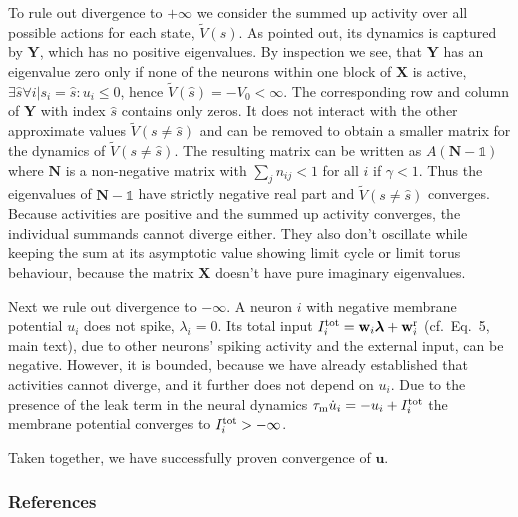 \documentclass[a4paper,11pt]{article}
\newcommand{\vw}{{\mathbf w}}
\newcommand{\vu}{{\mathbf u}}
\newcommand{\vlambda}{{\bm \lambda}}
\newcommand{\vX}{{\mathbf X}}
\newcommand{\vY}{{\mathbf Y}}
\newcommand{\vN}{{\mathbf N}}
\newcommand{\tV}{{\tilde{V}}}
\begin{document}
To rule out divergence to $+\infty$ we consider the summed up activity over all possible actions for each state, $\tV(s)$. As pointed out, its dynamics is captured by $\vY$, which has no positive eigenvalues. By inspection we see, that $\vY$ has an eigenvalue zero only if none of the neurons within one block of $\vX$ is active, $\exists \hat{s}\forall i|s_i=\hat{s}: u_i\leq0$, hence $\tV(\hat{s})=-V_0<\infty$. The corresponding row and column of $\vY$ with index $\hat{
s}$ contains only zeros. It does not interact with the other approximate values $\tV(s\neq\hat{s})$ and can be removed to obtain a smaller matrix for the dynamics of $\tV(s\neq\hat{s})$. The resulting matrix can be written as $A(\vN-\mathds{1})$ where $\vN$ is a non-negative matrix with $\sum_j n_{ij}<1$ for all $i$ if $\gamma<1$. Thus the eigenvalues of $\vN-\mathds{1}$ have strictly negative real part and $\tV(s\neq\hat{s})$ converges. 
Because activities are positive and the summed up activity converges, the individual summands cannot diverge either. They also don't oscillate while keeping the sum at its asymptotic value showing limit cycle or limit torus behaviour, because the matrix $\vX$ doesn't have pure imaginary eigenvalues. 

Next we rule out divergence to $-\infty$. A  neuron $i$ with negative membrane potential $u_i$ does not spike, $\lambda_i=0$. Its total input $I_i^{\rm tot}=\vw_i\vlambda + \vw_i^{\rm r}$ (cf.\ Eq.~5, main text), due to other neurons' spiking activity and the external input, can be negative. However, it is bounded, because we have already established that activities cannot diverge, and it further does not depend on $u_i$. Due to the presence of the leak term in the neural dynamics $\tau_{\rm m}\dot{u}_i = -u_i + I_i^{\rm tot}$ the membrane potential converges to  $I_i^{\rm tot}>-\infty$.

Taken together, we have successfully proven convergence of $\vu$.


\subsubsection*{References}
{\def\section*#1{}
\small
%


}
\end{document}
